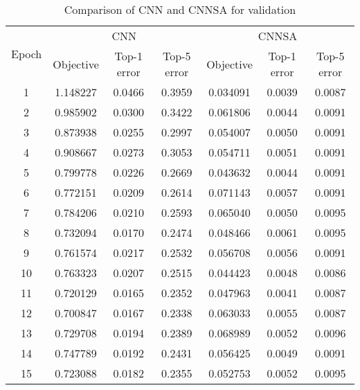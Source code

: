 \documentclass[10pt,letterpaper]{article}
\begin{document}
\begin{table}[]
\small
\caption{Comparison of CNN and CNNSA for validation}
\label{tab:my_label}

\begin{tabular}{c c c c c c c}
\hline
\multicolumn{1}{c}{\multirow{2}{*}{Epoch}} & \multicolumn{3}{c}{CNN} &
\multicolumn{3}{c}{CNNSA}\\
\cline{2-7}

\multicolumn{1}{r}{}     & \multicolumn{1}{c}{Objective} & \multicolumn{1}{c}{Top-1 error} & \multicolumn{1}{c}{Top-5 error} &
\multicolumn{1}{c}{Objective} & \multicolumn{1}{c}{Top-1 error} & \multicolumn{1}{c}{Top-5 error}\\
\hline

1		& 1.148227   & 0.0466    & 0.3959    & 0.034091  & 0.0039    & 0.0087        \\
2 		& 0.985902   & 0.0300    & 0.3422    & 0.061806  & 0.0044    & 0.0091         \\
3		& 0.873938   & 0.0255    & 0.2997    & 0.054007  & 0.0050    & 0.0091        \\
4		& 0.908667   & 0.0273    & 0.3053    & 0.054711  & 0.0051    & 0.0091   	  \\
5		& 0.799778   & 0.0226    & 0.2669    & 0.043632  & 0.0044    & 0.0091        \\
6		& 0.772151   & 0.0209    & 0.2614    & 0.071143  & 0.0057    & 0.0091        \\
7 		& 0.784206   & 0.0210    & 0.2593    & 0.065040  & 0.0050    & 0.0095        \\
8		& 0.732094   & 0.0170    & 0.2474    & 0.048466  & 0.0061    & 0.0095        \\
9		& 0.761574   & 0.0217    & 0.2532    & 0.056708  & 0.0056    & 0.0091        \\
10		& 0.763323   & 0.0207    & 0.2515    & 0.044423  & 0.0048    & 0.0086        \\
11		& 0.720129   & 0.0165    & 0.2352    & 0.047963  & 0.0041    & 0.0087        \\
12 		& 0.700847   & 0.0167    & 0.2338    & 0.063033  & 0.0055    & 0.0087          \\
13		& 0.729708   & 0.0194    & 0.2389    & 0.068989  & 0.0052    & 0.0096        \\
14		& 0.747789   & 0.0192    & 0.2431    & 0.056425  & 0.0049    & 0.0091   	  \\
15		& 0.723088   & 0.0182    & 0.2355    & 0.052753  & 0.0052    & 0.0095       \\

\hline
\end{tabular}
\end{table}
\end{document}

